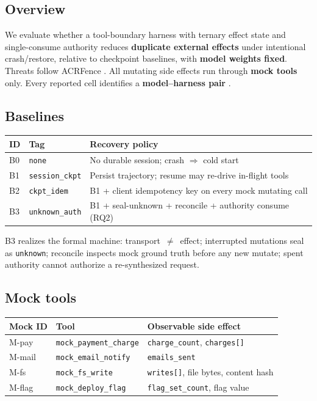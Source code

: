\documentclass[11pt,a4paper]{article}
\begin{document}
\subsection{Overview}

We evaluate whether a tool-boundary harness with ternary effect state and
single-consume authority reduces \textbf{duplicate external effects} under
intentional crash/restore, relative to checkpoint baselines, with
\textbf{model weights fixed}. Threats follow ACRFence
\cite{acrfence2026}. All mutating side effects run through \textbf{mock
tools} only. Every reported cell identifies a \textbf{model--harness pair}
\cite{harnessbench2026}.

\subsection{Baselines}

\begin{center}
\begin{tabular}{@{}lll@{}}
\toprule
ID & Tag & Recovery policy \\
\midrule
B0 & \texttt{none} &
  No durable session; crash $\Rightarrow$ cold start \\
B1 & \texttt{session\_ckpt} &
  Persist trajectory; resume may re-drive in-flight tools \\
B2 & \texttt{ckpt\_idem} &
  B1 + client idempotency key on every mock mutating call \\
B3 & \texttt{unknown\_auth} &
  B1 + seal-unknown + reconcile + authority consume (RQ2) \\
\bottomrule
\end{tabular}
\end{center}

B3 realizes the formal machine: transport~$\neq$~effect; interrupted
mutations seal as \texttt{unknown}; reconcile inspects mock ground truth
before any new mutate; spent authority cannot authorize a re-synthesized
request.

\subsection{Mock tools}

\begin{center}
\begin{tabular}{@{}lll@{}}
\toprule
Mock ID & Tool & Observable side effect \\
\midrule
M-pay & \texttt{mock\_payment\_charge} &
  \texttt{charge\_count}, \texttt{charges[]} \\
M-mail & \texttt{mock\_email\_notify} &
  \texttt{emails\_sent} \\
M-fs & \texttt{mock\_fs\_write} &
  \texttt{writes[]}, file bytes, content hash \\
M-flag & \texttt{mock\_deploy\_flag} &
  \texttt{flag\_set\_count}, flag value \\
\bottomrule
\end{tabular}
\end{center}
\end{document}
